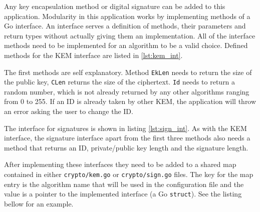 Any key encapsulation method or digital signature can be added to this application. Modularity in this application works by implementing methods of a Go interface. An interface serves a definition of methods, their parameters and return types without actually giving them an implementation. All of the interface methods need to be implemented for an algorithm to be a valid choice. Defined methods for the KEM interface are listed in \ref{lst:kem_int}.

The first methods are self explanatory. Method \texttt{EkLen} needs to return the size of the public key, \texttt{CLen} returns the size of the ciphertext. \texttt{Id} needs to return a random number, which is not already returned by any other algorithms ranging from 0 to 255. If an ID is already taken by other KEM, the application will throw an error asking the user to change the ID.

The interface for signatures is shown in listing \ref{lst:sign_int}. As with the KEM interface, the signature interface apart from the first three methods also needs a method that returns an ID, private/public key length and the signature length.

After implementing these interfaces they need to be added to a shared map contained in either \texttt{crypto/kem.go} or \texttt{crypto/sign.go} files. The key for the map entry is the algorithm name that will be used in the configuration file and the value is a pointer to the implemented interface (a Go \texttt{struct}). See the listing bellow for an example.

